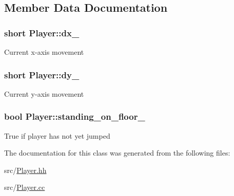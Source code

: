 \subsection{Member Data Documentation}
\hypertarget{classPlayer_a24f9dd9a89dc11513ed416dfaa27743b}{
\subsubsection[{dx\-\_\-}]{\setlength{\rightskip}{0pt plus 5cm}short Player\-::dx\-\_\-\hspace{0.3cm}{\ttfamily [private]}}}\label{classPlayer_a24f9dd9a89dc11513ed416dfaa27743b}
Current x-\/axis movement \hypertarget{classPlayer_a744cf17a4642fef56b8fe34abdfe9b74}{
\subsubsection[{dy\-\_\-}]{\setlength{\rightskip}{0pt plus 5cm}short Player\-::dy\-\_\-\hspace{0.3cm}{\ttfamily [private]}}}\label{classPlayer_a744cf17a4642fef56b8fe34abdfe9b74}
Current y-\/axis movement \hypertarget{classPlayer_af64bce8749b5148e518390dea7387ce7}{
\subsubsection[{standing\-\_\-on\-\_\-floor\-\_\-}]{\setlength{\rightskip}{0pt plus 5cm}bool Player\-::standing\-\_\-on\-\_\-floor\-\_\-\hspace{0.3cm}{\ttfamily [private]}}}\label{classPlayer_af64bce8749b5148e518390dea7387ce7}
True if player has not yet jumped 

The documentation for this class was generated from the following files\-:\begin{DoxyCompactItemize}
\item 
src/\hyperlink{Player_8hh}{Player.\-hh}\item 
src/\hyperlink{Player_8cc}{Player.\-cc}\end{DoxyCompactItemize}
